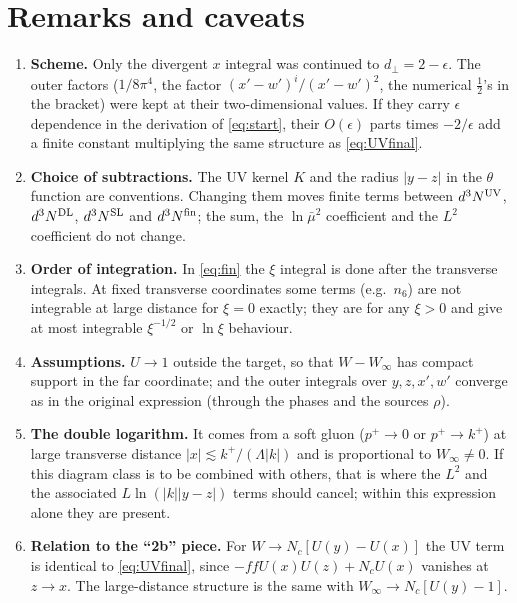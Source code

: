 \documentclass[11pt,a4paper]{article}
\newcommand{\Nc}{N_c}
\newcommand{\mubar}{\bar\mu}
\newcommand{\Winf}{W_\infty}
\begin{document}
\section{Remarks and caveats}
\begin{enumerate}
\item \textbf{Scheme.} Only the divergent $x$ integral was continued to $d_\perp=2-\epsilon$. The
outer factors ($1/8\pi^4$, the factor $(x'-w')^i/(x'-w')^2$, the numerical $\tfrac12$'s in the bracket) were kept
at their two-dimensional values. If they carry $\epsilon$ dependence in the derivation of
\eqref{eq:start}, their $O(\epsilon)$ parts times $-2/\epsilon$ add a finite constant multiplying the same
structure as \eqref{eq:UVfinal}.
\item \textbf{Choice of subtractions.} The UV kernel $K$ and the radius $|y-z|$ in the $\theta$
function are conventions. Changing them moves finite terms between
$d^3N^{\rm UV}$, $d^3N^{\rm DL}$, $d^3N^{\rm SL}$ and $d^3N^{\rm fin}$; the sum, the $\ln\mubar^2$ coefficient and the
$L^2$ coefficient do not change.
\item \textbf{Order of integration.} In \eqref{eq:fin} the $\xi$ integral is done after the transverse
integrals. At fixed transverse coordinates some terms (e.g.\ $n_6$) are not integrable at large distance
for $\xi=0$ exactly; they are for any $\xi>0$ and give at most integrable $\xi^{-1/2}$ or $\ln\xi$
behaviour.
\item \textbf{Assumptions.} $U\to1$ outside the target, so that $W-\Winf$ has compact support in the
far coordinate; and the outer integrals over $y,z,x',w'$ converge as in the original expression (through
the phases and the sources $\rho$).
\item \textbf{The double logarithm.} It comes from a soft gluon ($p^+\to0$ or $p^+\to k^+$) at large
transverse distance $|x|\lesssim k^+/(\Lambda|k|)$ and is proportional to $\Winf\ne0$. If this diagram
class is to be combined with others, that is where the $L^2$ and the associated
$L\ln(|k||y-z|)$ terms should cancel; within this expression alone they are present.
\item \textbf{Relation to the ``2b'' piece.} For $W\to\Nc[U(y)-U(x)]$ the UV term is identical to
\eqref{eq:UVfinal}, since $-ffU(x)U(z)+\Nc U(x)$ vanishes at $z\to x$. The large-distance structure is the
same with $\Winf\to\Nc[U(y)-1]$.
\end{enumerate}
\end{document}
